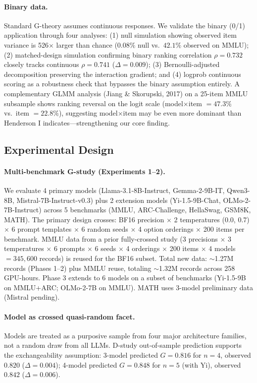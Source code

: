 \documentclass[11pt]{article}
\begin{document}
\paragraph{Binary data.}
Standard G-theory assumes continuous responses.
We validate the binary (0/1) application through four analyses: (1) null simulation showing observed item variance is 526$\times$ larger than chance ($0.08\%$ null vs.\ $42.1\%$ observed on MMLU); (2) matched-design simulation confirming binary ranking correlation $\rho = 0.732$ closely tracks continuous $\rho = 0.741$ ($\Delta = 0.009$); (3) Bernoulli-adjusted decomposition preserving the interaction gradient; and (4) logprob continuous scoring as a robustness check that bypasses the binary assumption entirely.
A complementary GLMM analysis (Jiang \& Skorupski, 2017) on a 25-item MMLU subsample shows ranking reversal on the logit scale (model$\times$item $= 47.3\%$ vs.\ item $= 22.8\%$), suggesting model$\times$item may be even more dominant than Henderson I indicates---strengthening our core finding.

\subsection{Experimental Design}

\paragraph{Multi-benchmark G-study (Experiments 1--2).}
We evaluate 4 primary models (Llama-3.1-8B-Instruct, Gemma-2-9B-IT, Qwen3-8B, Mistral-7B-Instruct-v0.3) plus 2 extension models (Yi-1.5-9B-Chat, OLMo-2-7B-Instruct) across 5 benchmarks (MMLU, ARC-Challenge, HellaSwag, GSM8K, MATH).
The primary design crosses: BF16 precision $\times$ 2 temperatures (0.0, 0.7) $\times$ 6 prompt templates $\times$ 6 random seeds $\times$ 4 option orderings $\times$ 200 items per benchmark.
MMLU data from a prior fully-crossed study (3 precisions $\times$ 3 temperatures $\times$ 6 prompts $\times$ 6 seeds $\times$ 4 orderings $\times$ 200 items $\times$ 4 models $= 345{,}600$ records) is reused for the BF16 subset.
Total new data: $\sim$1.27M records (Phases 1--2) plus MMLU reuse, totaling $\sim$1.32M records across 258 GPU-hours.
Phase 3 extends to 6 models on a subset of benchmarks (Yi-1.5-9B on MMLU+ARC; OLMo-2-7B on MMLU).
MATH uses 3-model preliminary data (Mistral pending).

\paragraph{Model as crossed quasi-random facet.}
Models are treated as a purposive sample from four major architecture families, not a random draw from all LLMs.
D-study out-of-sample prediction supports the exchangeability assumption: 3-model predicted $G = 0.816$ for $n = 4$, observed $0.820$ ($\Delta = 0.004$); 4-model predicted $G = 0.848$ for $n = 5$ (with Yi), observed $0.842$ ($\Delta = 0.006$).
\end{document}
